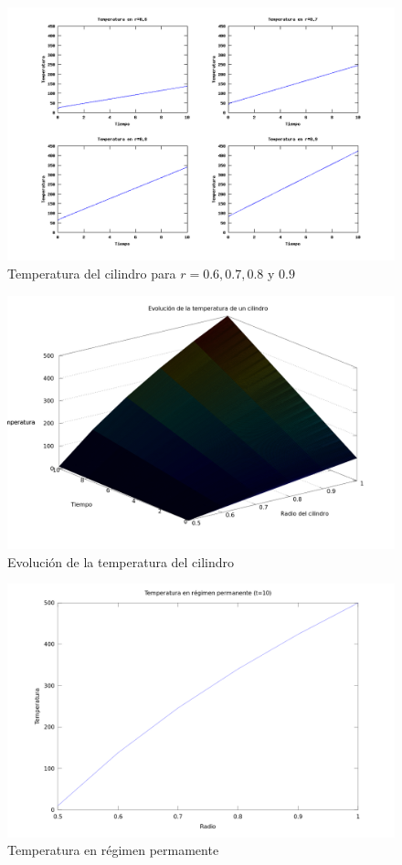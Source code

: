 \documentclass[journal, monochrome]{IEEEtran}
\begin{document}
\begin{figure}[hbp]
	\centering
	\includegraphics[scale = 0.50]{img/graph_c.png}
	\caption{Temperatura del cilindro para $r = 0.6,0.7,0.8$ y $0.9$}
	\label{figure:graphC}
\end{figure}
\begin{figure}
	\centering
	\includegraphics[scale = 0.25]{img/graph_mesh.png}
	\caption{Evolución de la temperatura del cilindro}
	\label{figure:mesh}
\end{figure}
\begin{figure}
	\centering
	\includegraphics[scale = 0.35]{img/graph_d.png}
	\caption{Temperatura en régimen permamente}
	\label{figure:graphD}
\end{figure}
\end{document}
